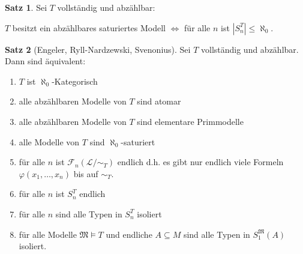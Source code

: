 \documentclass[12pt,parskip=full]{scrartcl}
\newcommand{\abs}[1]{{\left| #1 \right|}}
\theoremstyle{definition}
\newtheorem{theorem}{Satz}[section]
\begin{document}
	\begin{theorem}
		Sei $T$ vollständig und abzählbar:
		
		$T$ besitzt ein abzählbares saturiertes Modell $\Leftrightarrow$ für alle $n$ ist $\abs{S_n^T} \leq \aleph_0$.
	\end{theorem}

	\begin{theorem}[Engeler, Ryll-Nardzewski, Svenonius]
		Sei $T$ vollständig und abzählbar. Dann sind äquivalent:
		\begin{enumerate}
			\item $T$ ist $\aleph_0$-Kategorisch
			\item alle abzählbaren Modelle von $T$ sind atomar
			\item alle abzählbaren Modelle von $T$ sind elementare Primmodelle
			\item alle Modelle von $T$ sind $\aleph_0$-saturiert
			\item für alle $n$ ist $\mathcal{F}_n(\mathcal{L}/ \sim_T)$ endlich d.h. es gibt nur endlich viele Formeln $\varphi(x_1, \dots, x_n)$ bis auf $\sim_T$.
			\item für alle $n$ ist $S_n^T$ endlich
			\item für alle $n$ sind alle Typen in $S_n^T$ isoliert
			\item für alle Modelle $\mathfrak{M} \models T$ und endliche $A \subseteq M$ sind alle Typen in $S_1^\mathfrak{M}(A)$ isoliert.
		\end{enumerate}
	\end{theorem}
\end{document}
